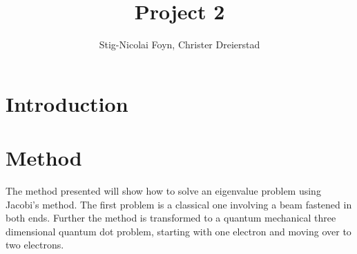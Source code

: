 \documentclass{emulateapj}
\begin{document}
\title{Project 2}

\author{Stig-Nicolai Foyn, Christer Dreierstad}




\begin{abstract}

\end{abstract}

\section{Introduction}
\label{sec:introduction}




\section{Method}
\label{sec:method}
The method presented will show how to solve an eigenvalue problem using Jacobi's method. The first problem is a classical one involving a beam fastened in both ends. Further the method is transformed to a quantum mechanical three dimensional quantum dot problem, starting with one electron and moving over to two electrons.
\end{document}

